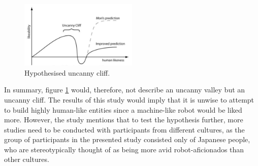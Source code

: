 \begin{figure} %
    \centering
    \includegraphics[width=0.5\textwidth]{graphics/uncanny_cliff.png}
    \caption{Hypothesised uncanny cliff.}
    \label{fig:uncannyCliff}
\end{figure}
In summary, figure \ref{fig:uncannyCliff} would, therefore, not describe an uncanny valley but an uncanny cliff.
The results of this study would imply that it is unwise to attempt to build highly human-like entities since a machine-like robot would be liked more. However, the study mentions that to test the hypothesis further, more studies need to be conducted with participants from different cultures, as the group of participants in the presented study consisted only of Japanese people, who are stereotypically thought of as being more avid robot-aficionados than other cultures.

